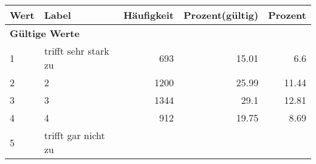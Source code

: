      \begin{longtable}{lXrrr}
     \toprule
     \textbf{Wert} & \textbf{Label} & \textbf{Häufigkeit} & \textbf{Prozent(gültig)} & \textbf{Prozent} \\
     \endhead
     \midrule
     \multicolumn{5}{l}{\textbf{Gültige Werte}}\\

     1 &
     \multicolumn{1}{X}{ trifft sehr stark zu   } &


       \num{693} &
       \num[round-mode=places,round-precision=2]{15.01} &
         \num[round-mode=places,round-precision=2]{6.6} \\

     2 &
     \multicolumn{1}{X}{ 2   } &


       \num{1200} &
       \num[round-mode=places,round-precision=2]{25.99} &
         \num[round-mode=places,round-precision=2]{11.44} \\

     3 &
     \multicolumn{1}{X}{ 3   } &


       \num{1344} &
       \num[round-mode=places,round-precision=2]{29.1} &
         \num[round-mode=places,round-precision=2]{12.81} \\

     4 &
     \multicolumn{1}{X}{ 4   } &


       \num{912} &
       \num[round-mode=places,round-precision=2]{19.75} &
         \num[round-mode=places,round-precision=2]{8.69} \\

     5 &
     \multicolumn{1}{X}{ trifft gar nicht zu   } &



\end{longtable}
